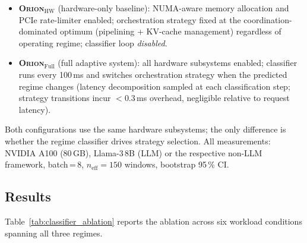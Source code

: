 \begin{itemize}
  \item \textbf{\textsc{Orion}$_{\mathrm{HW}}$} (hardware-only baseline):
    NUMA-aware memory allocation and PCIe rate-limiter enabled;
    orchestration strategy fixed at the coordination-dominated optimum
    (pipelining + KV-cache management) regardless of operating regime;
    classifier loop \emph{disabled}.
  \item \textbf{\textsc{Orion}$_{\mathrm{Full}}$} (full adaptive system):
    all hardware subsystems enabled; classifier runs every 100\,ms and
    switches orchestration strategy when the predicted regime changes
    (latency decomposition sampled at each classification step;
    strategy transitions incur $<$0.3\,ms overhead, negligible relative
    to request latency).
\end{itemize}

Both configurations use the same hardware subsystems; the only difference is
whether the regime classifier drives strategy selection.
All measurements: NVIDIA A100 (80\,GB), Llama-3\,8B (LLM) or the respective
non-LLM framework, batch\,=\,8, $n_{\mathrm{eff}}\!=\!150$ windows,
bootstrap 95\,\% CI.

\subsection{Results}

Table~\ref{tab:classifier_ablation} reports the ablation across six
workload conditions spanning all three regimes.

